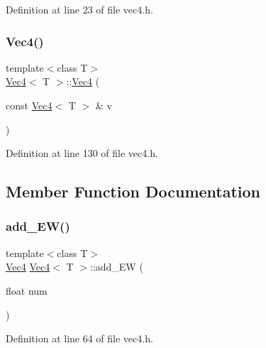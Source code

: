 Definition at line 23 of file vec4.\+h.

\mbox{\label{class_vec4_a97bc391079bc751f343234af6e6fb512}} 
\subsubsection{\texorpdfstring{Vec4()}{Vec4()}\hspace{0.1cm}{\footnotesize\ttfamily [4/4]}}
{\footnotesize\ttfamily template$<$class T$>$ \\
\mbox{\hyperlink{class_vec4}{Vec4}}$<$ T $>$\+::\mbox{\hyperlink{class_vec4}{Vec4}} (\begin{DoxyParamCaption}\item[{const \mbox{\hyperlink{class_vec4}{Vec4}}$<$ T $>$ \&}]{v }\end{DoxyParamCaption})\hspace{0.3cm}{\ttfamily [inline]}}



Definition at line 130 of file vec4.\+h.



\subsection{Member Function Documentation}
\mbox{\label{class_vec4_a7c53c3f53c0e46db0389daf2d2f52ee1}} 
\subsubsection{\texorpdfstring{add\_EW()}{add\_EW()}\hspace{0.1cm}{\footnotesize\ttfamily [1/2]}}
{\footnotesize\ttfamily template$<$class T$>$ \\
\mbox{\hyperlink{class_vec4}{Vec4}} \mbox{\hyperlink{class_vec4}{Vec4}}$<$ T $>$\+::add\+\_\+\+EW (\begin{DoxyParamCaption}\item[{float}]{num }\end{DoxyParamCaption})\hspace{0.3cm}{\ttfamily [inline]}}



Definition at line 64 of file vec4.\+h.

